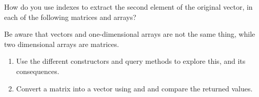 \documentclass[krantz2]{krantz}\usepackage{knitr}%
\begin{document}
\begin{playground}
  How do you use indexes to extract the second element of the original vector, in each of the following matrices and arrays?
\begin{knitrout}\footnotesize
{}\color{fgcolor}\begin{kframe}
\begin{alltt}
 \hlkwb{<-} \hlopt{:}
 \hlkwb{<-}   \hlstd{=} \hlstd{)}
 \hlkwb{<-}   \hlstd{=} \hlstd{,}  \hlstd{=} \hlstd{)}
 \hlkwb{<-}   \hlstd{=} \hlstd{)}
 \hlkwb{<-}   \hlstd{=} \hlstd{,}  \hlstd{=} \hlstd{)}
\end{alltt}
\end{kframe}
\end{knitrout}

\begin{knitrout}\footnotesize
{}\color{fgcolor}\begin{kframe}
\begin{alltt}
 \hlkwb{<-} \hlopt{:}
 \hlkwb{<-}   \hlstd{=} \hlstd{(}\hlstd{,} \hlstd{))}
 \hlkwb{<-}   \hlstd{=} \hlstd{(}\hlstd{,} \hlstd{),}  \hlstd{=} \hlstd{(}\hlstd{,} \hlstd{(}\hlstd{,} \hlstd{)))}
 \hlkwb{<-}   \hlstd{=} \hlstd{(}\hlstd{,} \hlstd{))}
\end{alltt}
\end{kframe}
\end{knitrout}

Be aware that vectors and one-dimensional arrays are not the same thing, while two dimensional arrays are matrices.
\begin{enumerate}
      \item Use the different constructors and query methods to explore this, and its consequences.
      \item Convert a matrix into a vector using  and  and compare the returned values.
\end{enumerate}

\end{playground}
\end{document}
